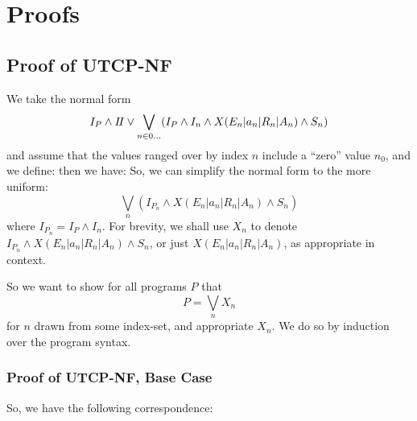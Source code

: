 \section{Proofs}\label{sec:proofs}

\subsection{Proof of \textsf{UTCP-NF}}

We take the normal form
\[
  I_P \land I\!I
      \lor
      \bigvee_{n \in 0\dots}
      (I_P \land I_n \land X(E_n|a_n|R_n|A_n) \land S_n)
\]
and  assume that the values ranged over by index $n$
include a ``zero'' value $n_0$,
and we define:
then we have:
So, we can simplify the normal form to the more uniform:
\[
\bigvee_n (I_{P_n} \land X(E_n|a_n|R_n|A_n) \land S_n)
\]
where $I_{P_n} = I_P \land I_n$.
For brevity, we shall use $X_n$ to denote
$I_{P_n} \land X(E_n|a_n|R_n|A_n) \land S_n$,
or just $X(E_n|a_n|R_n|A_n)$, as appropriate in context.

So we want to show for all programs $P$
that
\[
 P = \bigvee_n X_n
\]
for $n$ drawn from some index-set, and appropriate $X_n$.
We do so by induction over the program syntax.

\newpage
\subsubsection{Proof of \textsf{UTCP-NF}, Base Case}

So, we have the following correspondence:

